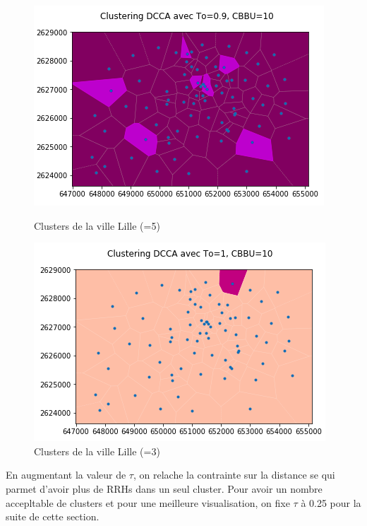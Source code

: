 \documentclass{report}
\begin{document}
\begin{figure}[H]
  \begin{minipage}{0.4\textwidth}
    \centering
    \includegraphics[scale=0.55]{images/To09.png}
    \caption{Clusters de la ville Lille (=5)}\label{Fig:Data1}
  \end{minipage}\hfill
  \begin{minipage}{0.4\textwidth}
    \centering
    \includegraphics[scale=0.55]{images/To1.png}
    \caption{Clusters de la ville Lille (=3)}\label{Fig:Data2}
  \end{minipage}
\end{figure}


En augmentant la valeur de $\tau$, on relache la contrainte sur la distance se qui parmet d'avoir plus de RRHs dans un seul cluster. 
Pour avoir un nombre accepltable de clusters et pour une meilleure visualisation, on fixe $\tau$ à 0.25 pour la suite de cette section.\\
\end{document}
